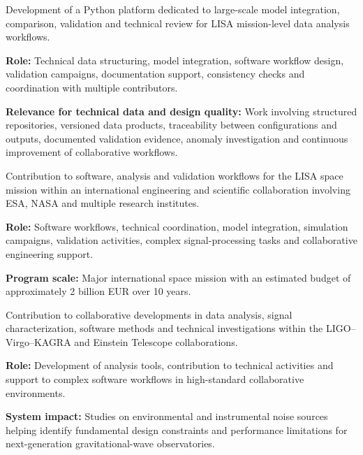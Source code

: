 \documentclass[8pt,a4paper,ragged2e,withhyper]{altacv}
\begin{document}


Development of a Python platform dedicated to large-scale model integration, comparison, validation and technical review for LISA mission-level data analysis workflows.

\textbf{Role:} Technical data structuring, model integration, software workflow design, validation campaigns, documentation support, consistency checks and coordination with multiple contributors.

\textbf{Relevance for technical data and design quality:} Work involving structured repositories, versioned data products, traceability between configurations and outputs, documented validation evidence, anomaly investigation and continuous improvement of collaborative workflows.

\divider


Contribution to software, analysis and validation workflows for the LISA space mission within an international engineering and scientific collaboration involving ESA, NASA and multiple research institutes.

\textbf{Role:} Software workflows, technical coordination, model integration, simulation campaigns, validation activities, complex signal-processing tasks and collaborative engineering support.

\textbf{Program scale:} Major international space mission with an estimated budget of approximately 2 billion EUR over 10 years.

\divider


Contribution to collaborative developments in data analysis, signal characterization, software methods and technical investigations within the LIGO--Virgo--KAGRA and Einstein Telescope collaborations.

\textbf{Role:} Development of analysis tools, contribution to technical activities and support to complex software workflows in high-standard collaborative environments.

\textbf{System impact:} Studies on environmental and instrumental noise sources helping identify fundamental design constraints and performance limitations for next-generation gravitational-wave observatories.
\end{document}
